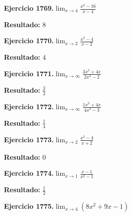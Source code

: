 \documentclass[10pt,a4paper]{article}
\begin{document}
\begin{ejbox}
\textbf{Ejercicio 1769.}\quad $\lim_{x\to 4} \frac{x^2-16}{x-4}$
\end{ejbox}

\begin{solbox}
\textbf{Resultado:} \(\displaystyle 8\)
\end{solbox}

\begin{ejbox}
\textbf{Ejercicio 1770.}\quad $\lim_{x\to 2} \frac{x^2-4}{x-2}$
\end{ejbox}

\begin{solbox}
\textbf{Resultado:} \(\displaystyle 4\)
\end{solbox}

\newpage
\begin{ejbox}
\textbf{Ejercicio 1771.}\quad $\lim_{x\to \infty} \frac{3x^3 + 4x}{2x^3 - 2}$
\end{ejbox}

\begin{solbox}
\textbf{Resultado:} \(\displaystyle \frac{3}{2}\)
\end{solbox}

\begin{ejbox}
\textbf{Ejercicio 1772.}\quad $\lim_{x\to \infty} \frac{1x^3 + 4x}{4x^3 - 3}$
\end{ejbox}

\begin{solbox}
\textbf{Resultado:} \(\displaystyle \frac{1}{4}\)
\end{solbox}

\begin{ejbox}
\textbf{Ejercicio 1773.}\quad $\lim_{x\to 2} \frac{x^2-4}{x+2}$
\end{ejbox}

\begin{solbox}
\textbf{Resultado:} \(\displaystyle 0\)
\end{solbox}

\newpage
\begin{ejbox}
\textbf{Ejercicio 1774.}\quad $\lim_{x\to 1} \frac{x-1}{x^2-1}$
\end{ejbox}

\begin{solbox}
\textbf{Resultado:} \(\displaystyle \frac{1}{2}\)
\end{solbox}

\begin{ejbox}
\textbf{Ejercicio 1775.}\quad $\lim_{x\to 4} (8x^2 +9x -1)$
\end{ejbox}
\end{document}
